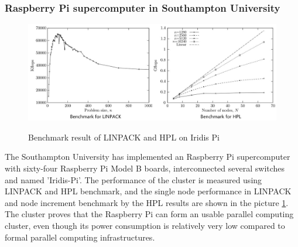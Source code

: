 \documentclass[11pt,openright,a4paper]{report}
\begin{document}
\subsubsection{Raspberry Pi supercomputer in Southampton University}
\begin{figure}[H]
	\centering
	\includegraphics[width=1.0\linewidth]{picture/iridisBenchmark}
	\caption{Benchmark result of LINPACK and HPL on Iridis Pi}\cite{cox2014iridis} 
	\label{fig:iridisBenchmark}
\end{figure}
The Southampton University has implemented an Raspberry Pi supercomputer with sixty-four Raspberry Pi Model B boards, interconnected several switches and named 'Iridis-Pi'\cite{cox2014iridis}. The performance of the cluster is measured using LINPACK and HPL benchmark, and the single node performance in LINPACK and node increment benchmark by the HPL results are shown in the picture \ref{fig:iridisBenchmark}. The cluster proves that the Raspberry Pi can form an usable parallel computing cluster, even though its power consumption is relatively very low compared to formal parallel computing infrastructures.\\
\end{document}
